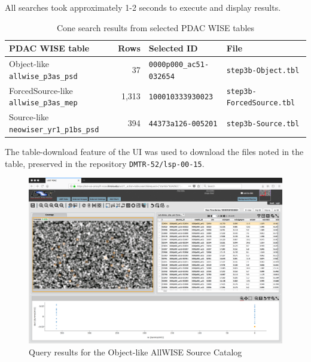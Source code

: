 All searches took approximately 1-2 seconds to execute and display results.

\begin{table}[h]
\centering
\begin{tabular}{l r l l}
PDAC WISE table & Rows & Selected ID & File \\ \hline
Object-like \verb|allwise_p3as_psd| & 37 & \verb|0000p000_ac51-032654| & \verb|step3b-Object.tbl| \\
ForcedSource-like \verb|allwise_p3as_mep| & 1,313 & \verb|100010333930023| & \verb|step3b-ForcedSource.tbl| \\
Source-like \verb|neowiser_yr1_p1bs_psd| & 394 & \verb|44373a126-005201| & \verb|step3b-Source.tbl| \\
\end{tabular}
\caption{Cone search results from selected PDAC WISE tables}
\label{tab:lsp-00-15-cone-results}
\end{table}

The table-download feature of the UI was used to download the files noted in the table,
preserved in the repository \verb|DMTR-52/lsp-00-15|.

\begin{figure}
  \includegraphics[width=\linewidth]{lsp-00-15/step3b-Object.png}
  \caption{Query results for the Object-like AllWISE Source Catalog}
  \label{fig:lsp-00-15-cone-Object}
\end{figure}

